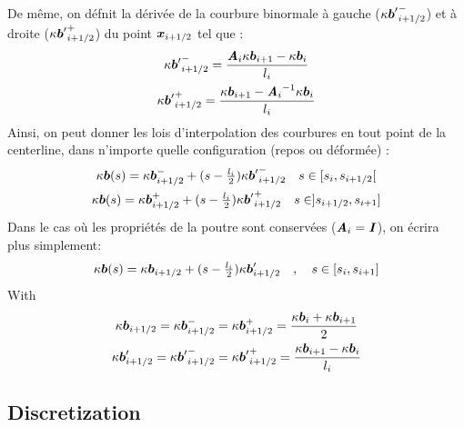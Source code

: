 De même, on défnit la dérivée de la courbure binormale à gauche (${\kappa\boldsymbol{b}'}^{-}_{i+1/2}$) et à droite (${\kappa\boldsymbol{b}'}^{+}_{i+1/2}$) du point $\boldsymbol{x}_{i+1/2}$ tel que :
\begin{subequations}
	\begin{gather}
		{\kappa\boldsymbol{b}'}^{-}_{i+1/2} = \frac{\boldsymbol{\mathit{A}}_i\kappa\boldsymbol{b}_{i+1} - \kappa\boldsymbol{b}_{i}}{l_i} \\
		{\kappa\boldsymbol{b}'}^{+}_{i+1/2} = \frac{\kappa\boldsymbol{b}_{i+1} - {\boldsymbol{\mathit{A}}_i}^{-1}\kappa\boldsymbol{b}_{i}}{l_i}
	\end{gather}
\end{subequations}
Ainsi, on peut donner les lois d'interpolation des courbures en tout point de la centerline, dans n'importe quelle configuration (repos ou déformée) :
\begin{subequations}
	\begin{gather}
		\kappa\boldsymbol{b}(s) = \kappa\boldsymbol{b}_{i+1/2}^- + (s-\tfrac{l_i}{2}) {\kappa\boldsymbol{b}'}^{-}_{i+1/2}
		\quad s \in [s_i,s_{i+1/2}[ \\
		\kappa\boldsymbol{b}(s) = \kappa\boldsymbol{b}_{i+1/2}^+ + (s-\tfrac{l_i}{2}) {\kappa\boldsymbol{b}'}^{+}_{i+1/2}
		\quad s \in ]s_{i+1/2}, s_{i+1}]
	\end{gather}
\end{subequations}
Dans le cas où les propriétés de la poutre sont conservées ($\boldsymbol{\mathit{A}}_i = \boldsymbol{\mathit{I}}$), on écrira plus simplement:
\begin{equation}
	\kappa\boldsymbol{b}(s) = \kappa\boldsymbol{b}_{i+1/2} + (s-\tfrac{l_i}{2}) \kappa\boldsymbol{b}'_{i+1/2} \quad , \quad s \in [s_i,s_{i+1}]
\end{equation}
With
\begin{subequations}
	\begin{gather}
		\kappa\boldsymbol{b}_{i+1/2} = \kappa\boldsymbol{b}_{i+1/2}^- = \kappa\boldsymbol{b}_{i+1/2}^+ =
		\frac{\kappa\boldsymbol{b}_{i} + \kappa\boldsymbol{b}_{i+1}}{2} \\
		\kappa\boldsymbol{b}'_{i+1/2} = {\kappa\boldsymbol{b}'}_{i+1/2}^- = {\kappa\boldsymbol{b}'}_{i+1/2}^+ =
		\frac{\kappa\boldsymbol{b}_{i+1} - \kappa\boldsymbol{b}_{i}}{l_i}
	\end{gather}
\end{subequations}


\subsection{Discretization}

